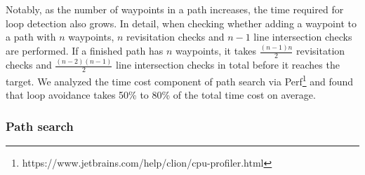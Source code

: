 \documentclass[letterpaper, 10 pt, journal, twoside]{IEEEtran}
\begin{document}
Notably, as the number of waypoints in a path increases, the time required for loop detection also grows. In detail, when checking whether adding a waypoint to a path with $n$ waypoints, $n$ revisitation checks and $n-1$ line intersection checks are performed. If a finished path has $n$ waypoints, it takes $\frac{(n-1)n}{2}$ revisitation checks and $\frac{(n-2)(n-1)}{2}$ line intersection checks in total before it reaches the target. We analyzed the time cost component of path search via Perf\footnote{https://www.jetbrains.com/help/clion/cpu-profiler.html} and found that loop avoidance takes 50\% to 80\% of the total time cost on average.



\subsubsection{Path search} 
\end{document}
